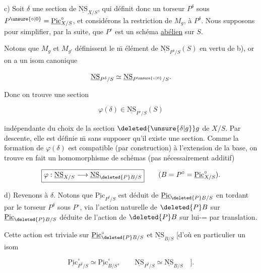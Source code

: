 
c) Soit $\delta$ une section de $\underline{\mathrm{NS}}_{X/S}$, qui définit donc un torseur $P^\delta$ sous $P^{\unsure{\circ|0}}=\underline{\mathrm{Pic}}^\circ_{X/S}$, et considérons la restriction de $M_g$,  à $P^\delta$. Nous supposons pour simplifier, par la suite, que $P^\circ$ est un schéma \uline{abélien} sur $S$.

Notons que $M_g$ et $M_{g'}$ définissent le \={m} élément de $\underline{\mathrm{NS}}_{P^\delta/S}(S)$ en vertu de b), or on a un isom canonique

\[
\underline{\mathrm{NS}}_{P^\delta/S}\simeq\underline{\mathrm{NS}}_{P^{\unsure{\circ|0}}/S}.
\]

Donc on trouve une section

\[
\varphi(\delta)\in\underline{\mathrm{NS}}_{P^\circ/S}(S)
\]

indépendante du choix de la section $\deleted{\unsure{\delta|g}}g$ de $X/S$. Par descente, elle est définie \={m} sans supposer qu'il existe une section. Comme la formation de $\varphi(\delta)$ est compatible (par construction) à l'extension de la base, on trouve en fait un homomorphisme de schémas (pas nécessairement additif)


\[
\boxed{\varphi:\underline{\mathrm{NS}}_{X/S}\longrightarrow\underline{\mathrm{NS}}_{\deleted{P}B/S}}\qquad(B=P^\circ=\underline{\mathrm{Pic}}^\circ_{X/S}).
\]

d) Revenons à $\delta$. Notons que $\underline{\mathrm{Pic}}_{P^\delta/S}$ est déduit de $\underline{\mathrm{Pic}}_{\deleted{P}B/S}$ en tordant par  le torseur $P^\delta$ sous $P^\circ$, via l'action naturelle de $\deleted{P}B$ sur $\underline{\mathrm{Pic}}_{\deleted{P}B/S}$ déduite de l'action de $\deleted{P}B$ sur lui-= par translation. 

Cette action est triviale sur $\underline{\mathrm{Pic}}^\circ_{\deleted{P}B/S}$ et $\underline{\mathrm{NS}}_{B/S}$ [d'où en particulier un isom

\[
\underline{\mathrm{Pic}}^\circ_{P^\delta/S}\simeq\underline{\mathrm{Pic}}^\circ_{B/S},\qquad
\underline{\mathrm{NS}}_{P^\delta/S}\simeq\underline{\mathrm{NS}}_{B/S}\quad].
\]

